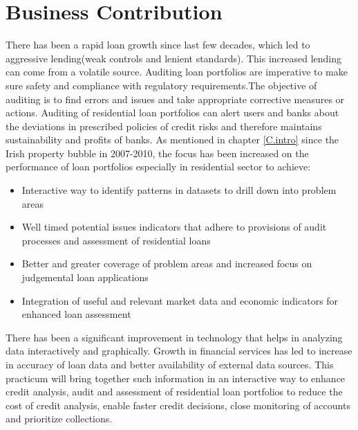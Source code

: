 \section{Business Contribution}
There has been a rapid loan growth since last few decades, which led to aggressive lending(weak controls and lenient standards). This increased lending can come from a volatile source. Auditing loan portfolios are imperative to make sure safety and compliance with regulatory requirements.The objective of auditing is to find errors and issues and take appropriate corrective measures or actions. Auditing of residential loan portfolios can alert users and banks about the deviations in prescribed policies of credit risks and therefore maintains sustainability and profits of banks. As mentioned in chapter \ref{C.intro} since the Irish property bubble in 2007-2010, the focus has been increased on the performance of loan portfolios especially in residential sector to achieve:
\begin{itemize}
\item Interactive way to identify patterns in datasets to drill down into problem areas
\item Well timed potential issues indicators that adhere to provisions of audit processes and assessment of residential loans
\item Better and greater coverage of problem areas and increased focus on judgemental loan applications
\item Integration of useful and relevant market data and economic indicators for enhanced loan assessment
\end{itemize}

There has been a significant improvement in technology that helps in analyzing data interactively and graphically. Growth in financial services has led to increase in accuracy of loan data and better availability of external data sources. This practicum will bring together such information in an interactive way to enhance credit analysis, audit and assessment of residential loan portfolios to reduce the cost of credit analysis, enable faster credit decisions, close monitoring of accounts and prioritize collections.
 